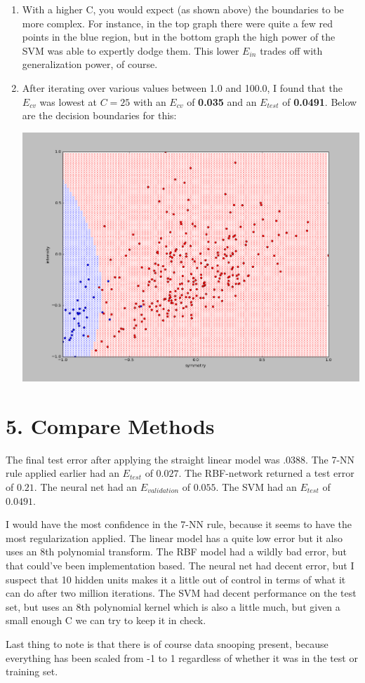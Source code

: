 \documentclass[12pt]{article}
\begin{document}
\begin{enumerate}[label=(\alph*)]
	\item With a higher C, you would expect (as shown above) the boundaries to be more complex. For instance, in the top graph there were quite a few red points in the blue region, but in the bottom graph the high power of the SVM was able to expertly dodge them. This lower $E_{in}$ trades off with generalization power, of course.
	
	\item After iterating over various values between 1.0 and 100.0, I found that the $E_{cv}$ was lowest at $C = 25$ with an $E_{cv}$ of \textbf{0.035} and an $E_{test}$ of \textbf{0.0491}. Below are the decision boundaries for this:
	
	\includegraphics[scale=0.6]{4a3.png}
\end{enumerate}

\section*{5. Compare Methods}
The final test error after applying the straight linear model was $\boldsymbol{.0388}$. The 7-NN rule applied earlier had an $E_{test}$ of $\boldsymbol{0.027}$. The RBF-network returned a test error of $\boldsymbol{0.21}$. The neural net had an $E_{validation}$ of $\boldsymbol{0.055}$. The SVM had an $E_{test}$ of $\boldsymbol{0.0491}$.

I would have the most confidence in the 7-NN rule, because it seems to have the most regularization applied. The linear model has a quite low error but it also uses an 8th polynomial transform. The RBF model had a wildly bad error, but that could've been implementation based. The neural net had decent error, but I suspect that 10 hidden units makes it a little out of control in terms of what it can do after two million iterations. The SVM had decent performance on the test set, but uses an 8th polynomial kernel which is also a little much, but given a small enough C we can try to keep it in check.

Last thing to note is that there is of course data snooping present, because everything has been scaled from -1 to 1 regardless of whether it was in the test or training set.
\end{document}
